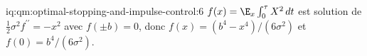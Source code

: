 \begin{solution}{iq:qm:optimal-stopping-and-impulse-control:6}
$f(x) = \E_x\int_0^\tau X^2\,dt$ est solution de $\tfrac12\sigma^2f^{\prime\prime} = -x^2$ avec $f(\pm b) = 0$, donc $f(x) = (b^4 - x^4)/(6\sigma^2)$ et $f(0) = b^4/(6\sigma^2)$.
\end{solution}
